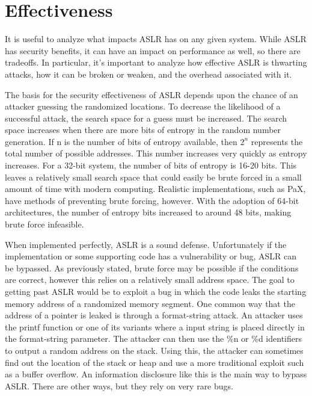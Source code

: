 \section{Effectiveness}
\label{s:effectiveness} %

It is useful to analyze what impacts ASLR has on any given system. While ASLR has security benefits, it can have an impact on performance as well, so there are tradeoffs. In particular, it’s important to analyze how effective ASLR is thwarting attacks, how it can be broken or weaken, and the overhead associated with it.

The basis for the security effectiveness of ASLR depends upon the chance of an attacker guessing the randomized locations. To decrease the likelihood of a successful attack, the search space for a guess must be increased. The search space increases when there are more bits of entropy in the random number generation. If n is the number of bits of entropy available, then $2^n$ represents the total number of possible addresses. This number increases very quickly as entropy increases. For a 32-bit system, the number of bits of entropy is 16-20 bits. This leaves a relatively small search space that could easily be brute forced in a small amount of time with modern computing. Realistic implementations, such as PaX, have methods of preventing brute forcing, however. With the adoption of 64-bit architectures, the number of entropy bits increased to around 48 bits, making brute force infeasible.

When implemented perfectly, ASLR is a sound defense. Unfortunately if the implementation or some supporting code has a vulnerability or bug, ASLR can be bypassed. As previously stated, brute force may be possible if the conditions are correct, however this relies on a relatively small address space. The goal to getting past ASLR would be to exploit a bug in which the code leaks the starting memory address of a randomized memory segment. One common way that the address of a pointer is leaked is through a format-string attack. \cite{bhatkar2003address} An attacker uses the printf function or one of its variants where a input string is placed directly in the format-string parameter. The attacker can then use the \%n or \%d identifiers to output a random address on the stack. Using this, the attacker can sometimes find out the location of the stack or heap and use a more traditional exploit such as a buffer overflow. An information disclosure like this is the main way to bypass ASLR. There are other ways, but they rely on very rare bugs.

